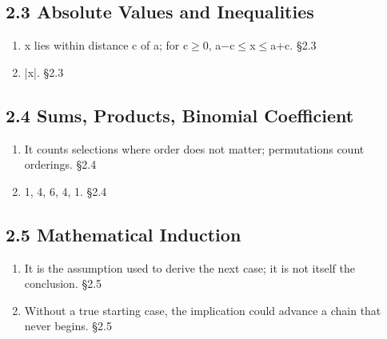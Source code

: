 \documentclass[11pt]{article}
\begin{document}
\begin{keepsection}\subsection{2.3 Absolute Values and Inequalities}

\begin{enumerate}
\item x lies within distance c of a; for c\ensuremath{\geq}0, a\ensuremath{-}c\ensuremath{\leq}x\ensuremath{\leq}a+c. \hfill{\small\color{FAUblue}§2.3}
\item |x|. \hfill{\small\color{FAUblue}§2.3}
\end{enumerate}

\end{keepsection}
\begin{keepsection}\subsection{2.4 Sums, Products, Binomial Coefficient}

\begin{enumerate}
\item It counts selections where order does not matter; permutations count orderings. \hfill{\small\color{FAUblue}§2.4}
\item 1, 4, 6, 4, 1. \hfill{\small\color{FAUblue}§2.4}
\end{enumerate}

\end{keepsection}
\begin{keepsection}\subsection{2.5 Mathematical Induction}

\begin{enumerate}
\item It is the assumption used to derive the next case; it is not itself the conclusion. \hfill{\small\color{FAUblue}§2.5}
\item Without a true starting case, the implication could advance a chain that never begins. \hfill{\small\color{FAUblue}§2.5}
\end{enumerate}

\end{keepsection}
\end{document}
